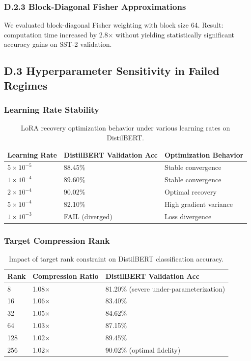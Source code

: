 \subsubsection{D.2.3 Block-Diagonal Fisher Approximations}

We evaluated block-diagonal Fisher weighting with block size 64. Result: 
computation time increased by 2.8$\times$ without yielding statistically significant accuracy gains on SST-2 validation.

\subsection{D.3 Hyperparameter Sensitivity in Failed Regimes}

\subsubsection{Learning Rate Stability}

\begin{table}[H]
\centering
\small
\begin{tabular}{lll}
\toprule
\textbf{Learning Rate} & \textbf{DistilBERT Validation Acc} & \textbf{Optimization Behavior} \\
\midrule
$5\times 10^{-5}$ & 88.45\% & Stable convergence \\
$1\times 10^{-4}$ & 89.60\% & Stable convergence \\
$2\times 10^{-4}$ & 90.02\% & Optimal recovery \\
$5\times 10^{-4}$ & 82.10\% & High gradient variance \\
$1\times 10^{-3}$ & FAIL (diverged) & Loss divergence \\
\bottomrule
\end{tabular}
\caption{LoRA recovery optimization behavior under various learning rates on DistilBERT.}
\label{tab:failed_lr}
\end{table}

\subsubsection{Target Compression Rank}

\begin{table}[H]
\centering
\small
\begin{tabular}{lll}
\toprule
\textbf{Rank} & \textbf{Compression Ratio} & \textbf{DistilBERT Validation Acc} \\
\midrule
8   & 1.08$\times$ & 81.20\% (severe under-parameterization) \\
16  & 1.06$\times$ & 83.40\% \\
32  & 1.05$\times$ & 84.62\% \\
64  & 1.03$\times$ & 87.15\% \\
128 & 1.02$\times$ & 89.45\% \\
256 & 1.02$\times$ & 90.02\% (optimal fidelity) \\
\bottomrule
\end{tabular}
\caption{Impact of target rank constraint on DistilBERT classification accuracy.}
\label{tab:rank_fidelity}
\end{table}

